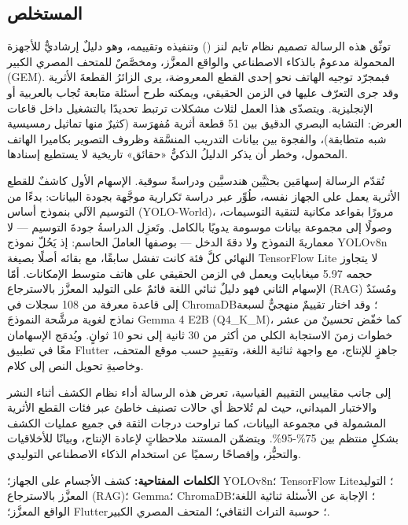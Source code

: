 \begin{otherlanguage}{arabic}
\chapter*{المستخلص}


توثّق هذه الرسالة تصميم نظام تايم لنز (\textenglish{\TimeLens{}}) وتنفيذه وتقييمه، وهو دليلٌ
إرشاديٌّ للأجهزة المحمولة مدعومٌ بالذكاء الاصطناعي والواقع المعزَّز، ومخصَّصٌ
للمتحف المصري الكبير (\textenglish{GEM}). فبمجرّد توجيه الهاتف نحو إحدى القطع
المعروضة، يرى الزائرُ القطعةَ الأثرية وقد جرى التعرّف عليها في الزمن الحقيقي،
ويمكنه طرح أسئلة متابعة تُجاب بالعربية أو الإنجليزية. ويتصدّى هذا العمل لثلاث
مشكلات ترتبط تحديدًا بالتشغيل داخل قاعات العرض: التشابه البصري الدقيق بين
\textenglish{51} قطعة أثرية مُفهرَسة (كثيرٌ منها تماثيل رمسيسية شبه متطابقة)، والفجوة بين بيانات
التدريب المنسَّقة وظروف التصوير بكاميرا الهاتف المحمول، وخطر أن يذكر الدليلُ
الذكيُّ «حقائق» تاريخية لا يستطيع إسنادها.

تُقدّم الرسالة إسهامَين بحثيَّين هندسيَّين ودراسةً سوقية. الإسهام الأول كاشفٌ
للقطع الأثرية يعمل على الجهاز نفسه، طُوِّر عبر دراسة تَكرارية موجَّهة بجودة
البيانات: بدءًا من التوسيم الآلي بنموذج أساس (\textenglish{YOLO-World})، مرورًا
بقواعد مكانية لتنقية التوسيمات، وصولًا إلى مجموعة بيانات موسومة يدويًا بالكامل.
وتَعزِل الدراسةُ جودةَ التوسيم — لا معماريةَ النموذج ولا دقةَ الدخل — بوصفها
العاملَ الحاسم: إذ يَحُلّ نموذج \textenglish{YOLOv8n} النهائي كلَّ فئة كانت تفشل
سابقًا، مع بقائه أصلًا بصيغة \textenglish{TensorFlow Lite} لا يتجاوز حجمه
\textenglish{5.97} ميغابايت ويعمل في الزمن الحقيقي على هاتف متوسط الإمكانات. أمّا الإسهام
الثاني فهو دليلٌ ثنائي اللغة قائمٌ على التوليد المعزَّز بالاسترجاع
(\textenglish{RAG}) ومُسنَدٌ إلى قاعدة معرفة من 108 سجلات في \textenglish{ChromaDB}؛
وقد اختار تقييمٌ منهجيٌّ لسبعة نماذج لغوية مرشَّحة النموذجَ
\textenglish{Gemma 4 E2B (Q4\_K\_M)}، كما خفّض تحسينٌ من عشر خطوات زمنَ الاستجابة
الكلي من أكثر من \textenglish{30} ثانية إلى نحو \textenglish{10} ثوانٍ. ويُدمَج الإسهامان معًا في تطبيق
\textenglish{Flutter} جاهزٍ للإنتاج، مع واجهة ثنائية اللغة، وتقييدٍ حسب موقع
المتحف، وخاصيةِ تحويل النص إلى كلام.

إلى جانب مقاييس التقييم القياسية، تعرض هذه الرسالة أداء نظام الكشف أثناء النشر والاختبار الميداني، حيث لم تُلاحظ أي حالات تصنيف خاطئ عبر فئات القطع الأثرية المشمولة في مجموعة البيانات، كما تراوحت درجات الثقة في جميع عمليات الكشف بشكلٍ منتظم بين \textenglish{75\%-95\%}. ويتضمّن المستند ملاحظاتٍ لإعادة الإنتاج، وبيانًا للأخلاقيات والتحيُّز،
وإفصاحًا رسميًا عن استخدام الذكاء الاصطناعي التوليدي.

\vspace{1.2em}
\noindent\textbf{الكلمات المفتاحية:} كشف الأجسام على الجهاز؛ \textenglish{YOLOv8n}؛
\textenglish{TensorFlow Lite}؛ التوليد المعزَّز بالاسترجاع (\textenglish{RAG})؛
\textenglish{Gemma}؛ \textenglish{ChromaDB}؛ الإجابة عن الأسئلة ثنائية اللغة؛
الواقع المعزَّز؛ \textenglish{Flutter}؛ حوسبة التراث الثقافي؛ المتحف المصري الكبير.
\end{otherlanguage}
\fi
